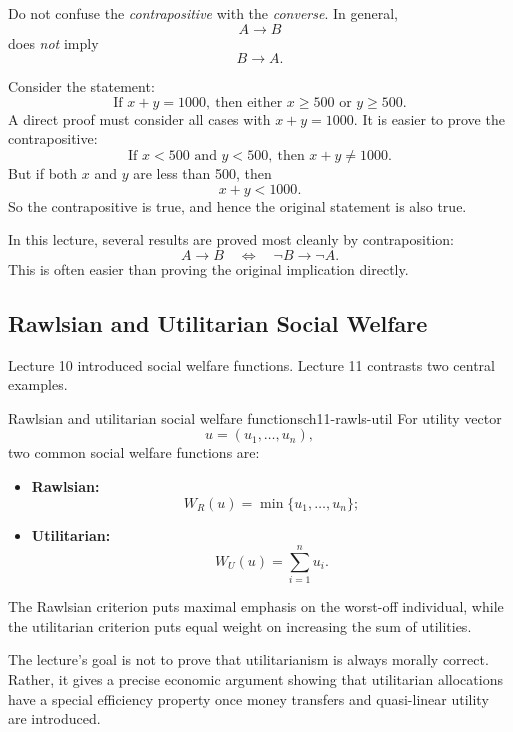 \begin{commonmistake}
Do not confuse the \emph{contrapositive} with the \emph{converse}. In general,
\[
A \to B
\]
does \emph{not} imply
\[
B \to A.
\]
\end{commonmistake}

\begin{examplebox}[title={Worked Example: Using a contrapositive}]
Consider the statement:
\[
\text{If } x+y=1000,\ \text{then either } x\ge 500 \text{ or } y\ge 500.
\]
A direct proof must consider all cases with $x+y=1000$. It is easier to prove the contrapositive:
\[
\text{If } x<500 \text{ and } y<500,\ \text{then } x+y\neq 1000.
\]
But if both $x$ and $y$ are less than 500, then
\[
x+y<1000.
\]
So the contrapositive is true, and hence the original statement is also true.
\end{examplebox}

\begin{examtip}
In this lecture, several results are proved most cleanly by contraposition:
\[
A \to B
\quad \Longleftrightarrow \quad
\neg B \to \neg A.
\]
This is often easier than proving the original implication directly.
\end{examtip}

\subsection{Rawlsian and Utilitarian Social Welfare}

Lecture 10 introduced social welfare functions. Lecture 11 contrasts two central examples.

\begin{definition}{Rawlsian and utilitarian social welfare functions}{ch11-rawls-util}
For utility vector
\[
u=(u_1,\dots,u_n),
\]
two common social welfare functions are:
\begin{itemize}
    \item \textbf{Rawlsian:}
    \[
    W_R(u)=\min\{u_1,\dots,u_n\};
    \]
    \item \textbf{Utilitarian:}
    \[
    W_U(u)=\sum_{i=1}^n u_i.
    \]
\end{itemize}
\end{definition}

The Rawlsian criterion puts maximal emphasis on the worst-off individual, while the utilitarian criterion puts equal weight on increasing the sum of utilities.

\begin{policynote}
The lecture's goal is not to prove that utilitarianism is always morally correct. Rather, it gives a precise economic argument showing that utilitarian allocations have a special efficiency property once money transfers and quasi-linear utility are introduced.
\end{policynote}

